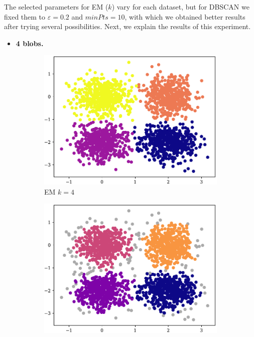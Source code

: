 The selected parameters for EM ($k$) vary for each dataset, but for DBSCAN we fixed them to $\varepsilon = 0.2$ and $minPts = 10$, with which we obtained better results after trying several possibilities. Next, we explain the results of this experiment.
\begin{itemize}
    \item \textbf{4 blobs.}
\end{itemize}
\begin{figure}[t!]
    \begin{subfigure}[b]{0.45\textwidth}
            \includegraphics[width=\textwidth]{../plots/4-4_pred_em.pdf}
            \caption{EM $k = 4$}
            \label{subfig:4-4-em}
    \end{subfigure}
    \hspace{0.09\textwidth}
    \begin{subfigure}[b]{0.45\textwidth}
        \includegraphics[width=\textwidth]{../plots/4-4_pred_dbscan.pdf}

\end{subfigure}
\end{figure}
